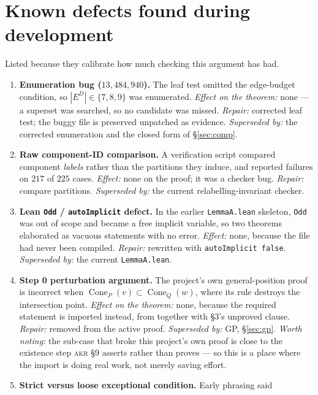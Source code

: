 \documentclass[11pt,a4paper]{article}
\theoremstyle{plain}
\theoremstyle{definition}
\theoremstyle{remark}
\newcommand{\ED}{E^{D}}
\newcommand{\Cone}{\operatorname{Cone}}
\begin{document}
\section{Known defects found during development}\label{sec:defects}

Listed because they calibrate how much checking this argument has had.

\begin{enumerate}[leftmargin=*]
  \item \textbf{Enumeration bug ($13{,}484{,}940$).} The leaf test omitted the
    edge-budget condition, so $|\ED|\in\{7,8,9\}$ was enumerated.
    \emph{Effect on the theorem:} none --- a superset was searched, so no
    candidate was missed. \emph{Repair:} corrected leaf test; the buggy file is
    preserved unpatched as evidence. \emph{Superseded by:} the corrected
    enumeration and the closed form of \S\ref{sec:comp}.
  \item \textbf{Raw component-ID comparison.} A verification script compared
    component \emph{labels} rather than the partitions they induce, and reported
    failures on $217$ of $225$ cases. \emph{Effect:} none on the proof; it was a
    checker bug. \emph{Repair:} compare partitions. \emph{Superseded by:} the
    current relabelling-invariant checker.
  \item \textbf{Lean \texttt{Odd} / \texttt{autoImplicit} defect.} In the earlier
    \texttt{LemmaA.lean} skeleton, \texttt{Odd} was out of scope and became a
    free implicit variable, so two theorems elaborated as vacuous statements with
    no error. \emph{Effect:} none, because the file had never been compiled.
    \emph{Repair:} rewritten with \texttt{autoImplicit false}.
    \emph{Superseded by:} the current \texttt{LemmaA.lean}.
  \item \textbf{Step 0 perturbation argument.} The project's own
    general-position proof is incorrect when $\Cone_P(v)\subset\Cone_Q(w)$, where
    its rule destroys the intersection point. \emph{Effect on the theorem:} none,
    because the required statement is imported instead, from
    \cite[\S9]{AckermanKeszeghRote2022} together with \S3's unproved clause.
    \emph{Repair:} removed from the active proof. \emph{Superseded by:}
    \textsf{GP}, \S\ref{sec:gp}. \emph{Worth noting:} the sub-case that broke
    this project's own proof is close to the existence step \textsc{akr} \S9
    asserts rather than proves --- so this is a place where the import is doing
    real work, not merely saving effort.
  \item \textbf{Strict versus loose exceptional condition.} Early phrasing said

\end{enumerate}
\end{document}
